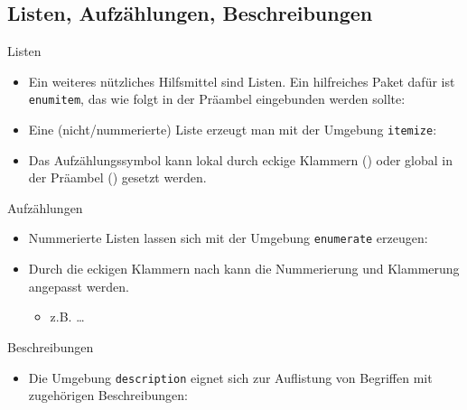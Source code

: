 \subsection{Listen, Aufzählungen, Beschreibungen}

\begin{frame}[fragile]{Listen}
    \begin{itemize}
        \item Ein weiteres nützliches Hilfsmittel sind \alert{Listen}. Ein hilfreiches Paket dafür
            ist \texttt{enumitem}, das wie folgt in der Präambel eingebunden werden sollte:
            \begin{center}
                \code{\usepackage[shortlabels]{enumitem}}
            \end{center}
        \item Eine (nicht\-/nummerierte) Liste erzeugt man mit der Umgebung \texttt{itemize}:
        \item Das Aufzählungssymbol kann lokal durch eckige Klammern (\code{\item[...]}) oder
            global in der Präambel () gesetzt werden.
    \end{itemize}
\end{frame}

\begin{frame}[fragile]{Aufzählungen}
    \begin{itemize}
        \item Nummerierte Listen lassen sich mit der Umgebung \texttt{enumerate} erzeugen:
        \item Durch die eckigen Klammern nach \code{\begin{enumerate}} kann die Nummerierung
            und Klammerung angepasst werden.
            \begin{itemize}
                \item z.B. \code{[(i)], [1)], [A.],} \dots
            \end{itemize}
    \end{itemize}
\end{frame}

\begin{frame}[fragile]{Beschreibungen}
    \begin{itemize}
        \item Die Umgebung \texttt{description} eignet sich zur Auflistung von Begriffen mit
            zugehörigen Beschreibungen:
    \end{itemize}
\end{frame}

